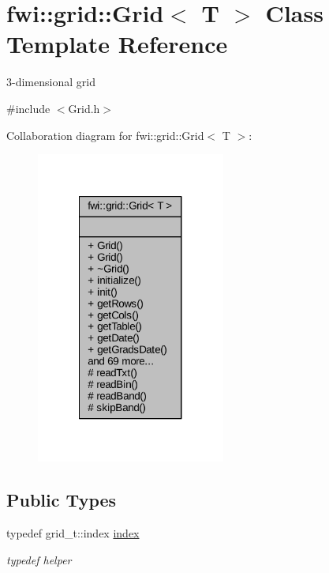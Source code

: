\hypertarget{classfwi_1_1grid_1_1Grid}{\section{fwi\-:\-:grid\-:\-:Grid$<$ T $>$ Class Template Reference}
\label{classfwi_1_1grid_1_1Grid}
}


3-\/dimensional grid  




{\ttfamily \#include $<$Grid.\-h$>$}



Collaboration diagram for fwi\-:\-:grid\-:\-:Grid$<$ T $>$\-:
\nopagebreak
\begin{figure}[H]
\begin{center}
\leavevmode
\includegraphics[width=176pt]{classfwi_1_1grid_1_1Grid__coll__graph}
\end{center}
\end{figure}
\subsection*{Public Types}
\begin{DoxyCompactItemize}
\item 
\hypertarget{classfwi_1_1grid_1_1Grid_a890011022f243b72633d7bc28fa7494e}{typedef grid\-\_\-t\-::index \hyperlink{classfwi_1_1grid_1_1Grid_a890011022f243b72633d7bc28fa7494e}{index}}\label{classfwi_1_1grid_1_1Grid_a890011022f243b72633d7bc28fa7494e}

\begin{DoxyCompactList}\small\item\em typedef helper \end{DoxyCompactList}\end{DoxyCompactItemize}
